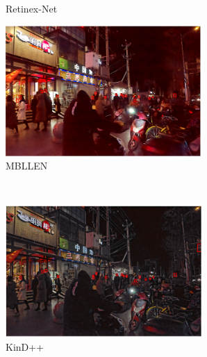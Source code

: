 \documentclass[letterpaper,12pt]{article}
\begin{document}
\begin{figure}[htbp]
\begin{subfigure}{0.22\textwidth}
			\captionsetup{font=scriptsize}
			\caption{Retinex-Net}
			\label{fig: DARK_FACE_c}
		\end{subfigure}
		\begin{subfigure}{0.22\textwidth}
			\includegraphics[width=\linewidth]{DARK_FACE/MBLLEN}
			\captionsetup{font=scriptsize}
			\caption{MBLLEN}
			\label{fig: DARK_FACE_d}
		\end{subfigure}\\ 
		\begin{subfigure}{0.22\textwidth}
			\includegraphics[width=\linewidth]{DARK_FACE/KinD++}
			\captionsetup{font=scriptsize}
			\caption{KinD++}
			\label{fig: DARK_FACE_e}
		\end{subfigure}
		\begin{subfigure}{0.22\textwidth}

\end{subfigure}
\end{figure}
\end{document}
